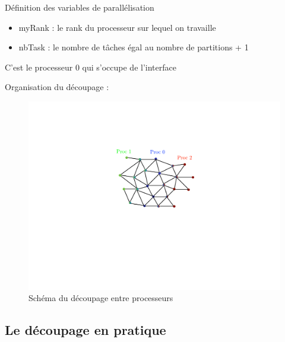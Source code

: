 \documentclass[10pt]{beamer}
\begin{document}
	\begin{frame}	
		\vspace*{33pt}
		Définition des variables de parallélisation
		\begin{itemize}
			\item myRank : le rank du processeur sur lequel on travaille
			\item nbTask : le nombre de tâches égal au nombre de partitions + 1
		\end{itemize}
		C'est le processeur 0 qui s'occupe de l'interface\\
		\vspace*{11pt}

		Organisation du découpage : \\
		\begin{figure}[H]
		\includegraphics[scale=0.4]{Essai.pdf}
		\caption{Schéma du découpage entre processeurs}
		\end{figure}


	

	\end{frame}



	\subsection{Le découpage en pratique}
\end{document}
